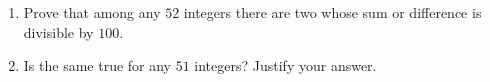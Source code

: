 \begin{enumerate}
\item[(a)] Prove that among any $52$ integers there are two whose sum or difference is divisible by $100$.
\item[(b)] Is the same true for any $51$ integers? Justify your answer.
\end{enumerate}
